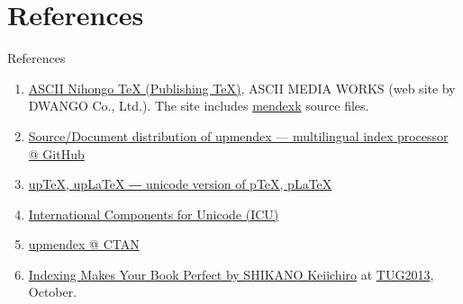 \documentclass[aspectratio=169,10pt]{beamer}
\begin{document}
\section{References}
\begin{frame}{References}

\begin{enumerate}
 \item \href{https://asciidwango.github.io/ptex/}{ASCII Nihongo TeX (Publishing TeX)}, ASCII MEDIA WORKS (web site by DWANGO Co., Ltd.).
  The site includes \href{https://asciidwango.github.io/ptex/base/sources.html\#mendexk}{mendexk} source files.
 \item \href{https://github.com/t-tk/upmendex-package}{Source/Document distribution of upmendex --- multilingual index processor @ GitHub}
 \item \href{http://www.t-lab.opal.ne.jp/tex/uptex_en.html}{upTeX, upLaTeX ― unicode version of pTeX, pLaTeX}
 \item \href{https://icu.unicode.org/}{International Components for Unicode (ICU)}
 \item \href{https://ctan.org/pkg/upmendex/}{upmendex @ CTAN}
 \item \href{https://tug.org/tug2013/slides/shikano.pdf}{Indexing Makes Your Book Perfect by SHIKANO Keiichiro} at \href{https://tug.org/tug2013/}{TUG2013}, October.
\end{enumerate}


\end{frame}
\end{document}
